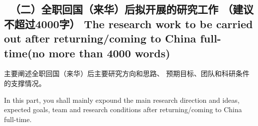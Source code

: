 {\color{MsBlue} \subsection{\sihao \kaishu \quad \ 
\textbf{（二）全职回国（来华）后拟开展的研究工作} （建议不超过4000字） 
\bfseries \xiaosihao {} 
The research work to 
be carried out after returning/coming to China full-time(no more than 4000 words)} 
}
%

{\sihao \color{MsBlue} \kaishu 主要阐述全职回国（来华）后主要研究方向和思路、
预期目标、团队和科研条件的支撑情况。}

{\color{MsBlue}  
In this part, you shall mainly expound the main research direction and ideas, 
expected goals, team and research conditions after returning/coming to China 
full-time.}


